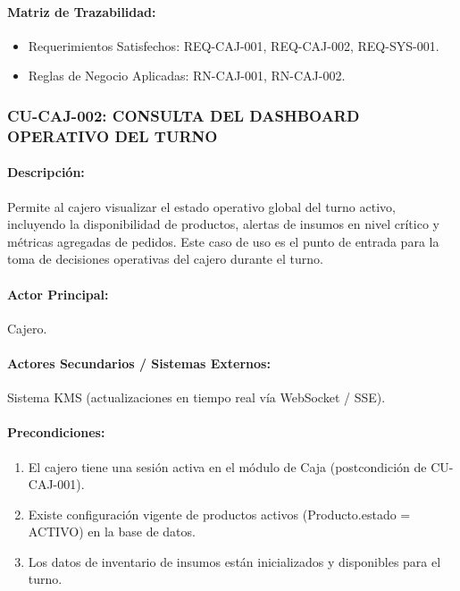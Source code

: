 \paragraph{Matriz de Trazabilidad:}
\begin{itemize}
    \item Requerimientos Satisfechos: REQ-CAJ-001, REQ-CAJ-002, REQ-SYS-001.
    \item Reglas de Negocio Aplicadas: RN-CAJ-001, RN-CAJ-002.
\end{itemize}

\subsubsection{CU-CAJ-002: CONSULTA DEL DASHBOARD OPERATIVO DEL TURNO}
\paragraph{Descripción:} Permite al cajero visualizar el estado operativo global del turno activo, incluyendo la disponibilidad de productos, alertas de insumos en nivel crítico y métricas agregadas de pedidos. Este caso de uso es el punto de entrada para la toma de decisiones operativas del cajero durante el turno.

\paragraph{Actor Principal:} Cajero.

\paragraph{Actores Secundarios / Sistemas Externos:} Sistema KMS (actualizaciones en tiempo real vía WebSocket / SSE).

\paragraph{Precondiciones:}
\begin{enumerate}
    \item[I.] El cajero tiene una sesión activa en el módulo de Caja (postcondición de CU-CAJ-001).
    \item[II.] Existe configuración vigente de productos activos (Producto.estado = ACTIVO) en la base de datos.
    \item[III.] Los datos de inventario de insumos están inicializados y disponibles para el turno.
\end{enumerate}

